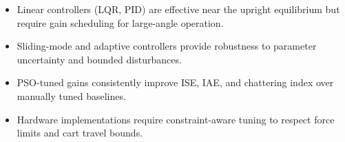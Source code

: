 \documentclass[11pt,a4paper]{article}
\begin{document}
\begin{itemize}
    \item Linear controllers (LQR, PID) are effective near the upright
          equilibrium but require gain scheduling for large-angle operation.
    \item Sliding-mode and adaptive controllers provide robustness to parameter
          uncertainty and bounded disturbances.
    \item PSO-tuned gains consistently improve ISE, IAE, and chattering index
          over manually tuned baselines.
    \item Hardware implementations require constraint-aware tuning to respect
          force limits and cart travel bounds.
\end{itemize}

\end{document}
